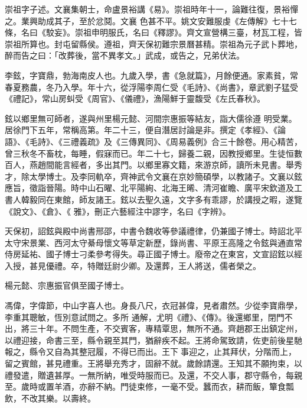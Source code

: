 \begin{pinyinscope}
 崇祖字子述。文襄集朝士，命盧景裕講《易》。崇祖時年十一，論難往復，景裕憚之。業興助成其子，至於忿鬩。文襄
 色甚不平。姚文安難服虔《左傳解》七十七條，名曰《駮妄》。崇祖申明服氏，名曰《釋謬》。齊文宣營構三臺，材瓦工程，皆崇祖所算也。封屯留縣侯。遵祖，齊天保初難宗景曆甚精。崇祖為元子武卜葬地，醉而告之曰：「改葬後，當不異孝文。」武成，或告之，兄弟伏法。



 李鉉，字寶鼎，勃海南皮人也。九歲入學，書《急就篇》，月餘便通。家素貧，常春夏務農，冬乃入學。年十六，從浮陽李周仁受《毛詩》、《尚書》，章武劉子猛受《禮記》，常山房虯受《周官》、《儀禮》，漁陽鮮于靈馥受《左氏春秋》。



 鉉以鄉里無可師者，遂與州里楊元懿、河間宗惠振等結友，詣大儒徐遵
 明受業。居徐門下五年，常稱高第。年二十三，便自潛居討論是非。撰定《孝經》、《論語》、《毛詩》、《三禮義疏》及《三傳異同》、《周易義例》合三十餘卷。用心精苦，曾三秋冬不畜枕，每睡，假寐而已。年二十七，歸養二親，因教授鄉里。生徒恒數百人，燕趙間能言經者，多出其門。以鄉里寡文籍，來游京師，讀所未見書。舉秀才，除太學博士。及李同軌卒，齊神武令文襄在京妙簡碩學，以教諸子。文襄以鉉應旨，徵詣晉陽。時中山石曜、北平陽絢、北海王晞、清河崔瞻、廣平宋欽道及工書人韓毅同在東館，師友諸王。鉉以去聖久遠，文字多有乖謬，於講授之暇，遂覽《說文》、《倉》、《
 雅》，刪正六藝經注中謬字，名曰《字辨》。



 天保初，詔鉉與殿中尚書邢邵，中書令魏收等參議禮律，仍兼國子博士。時詔北平太守宋景業、西河太守綦母懷文等草定新歷，錄尚書、平原王高隆之令鉉與通直常侍房延祐、國子博士刁柔參考得失。尋正國子博士。廢帝之在東宮，文宣詔鉉以經入授，甚見優禮。卒，特贈廷尉少卿。及還葬，王人將送，儒者榮之。



 楊元懿、宗惠振官俱至國子博士。



 馮偉，字偉節，中山字喜人也。身長八尺，衣冠甚偉，見者肅然。少從李寶鼎學，李重其聰敏，恆別意試問之。多所
 通解，尤明《禮》、《傳》。後還鄉里，閉門不出，將三十年。不問生產，不交賓客，專精覃思，無所不通。齊趙郡王出鎮定州，以禮迎接，命書三至，縣令親至其門，猶辭疾不起。王將命駕致請，佐吏前後星馳報之，縣令又自為其整冠履，不得已而出。王下事迎之，止其拜伏，分階而上，留之賓館，甚見禮重。王將舉充秀才，固辭不就。歲餘請還。王知其不願拘束，以禮發遣，贈遺甚厚。一無所納，唯受時服而已。及還，不交人事，郡守縣令，每親至。歲時或置羊酒，亦辭不納。門徒束修，一毫不受。蠶而衣，耕而飯，簞食瓢飲，不改其樂。以壽終。




\end{pinyinscope}
